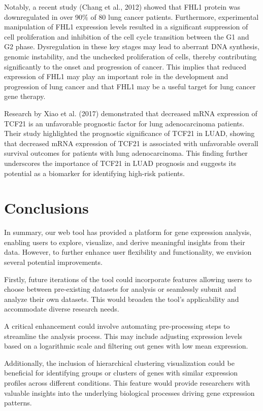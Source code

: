 \documentclass[
	a4paper, %
	10pt, %
	unnumberedsections, %
	twoside, %
]{LTJournalArticle}
\begin{document}
Notably, a recent study (Chang et al., 2012) \autocite{Chang:fhl1} showed that FHL1 protein was downregulated in over 90$\%$ of 80 lung cancer patients. Furthermore, experimental manipulation of FHL1 expression levels resulted in a significant suppression of cell proliferation and inhibition of the cell cycle transition between the G1 and G2 phase. Dysregulation in these key stages may lead to aberrant DNA synthesis, genomic instability, and the unchecked proliferation of cells, thereby contributing significantly to the onset and progression of cancer. This implies that reduced expression of FHL1 may play an important role in the development and progression of lung cancer and that FHL1 may be a useful target for lung cancer gene therapy.

Research by Xiao et al. (2017) \autocite{Xiao:TCF21} demonstrated that decreased mRNA expression of TCF21 is an unfavorable prognostic factor for lung adenocarcinoma patients. Their study highlighted the prognostic significance of TCF21 in LUAD, showing that decreased mRNA expression of TCF21 is associated with unfavorable overall survival outcomes for patients with lung adenocarcinoma. This finding further underscores the importance of TCF21 in LUAD prognosis and suggests its potential as a biomarker for identifying high-risk patients.

\section{Conclusions}

In summary, our web tool has provided a platform for gene expression analysis, enabling users to explore, visualize, and derive meaningful insights from their data. However, to further enhance user flexibility and functionality, we envision several potential improvements.

Firstly, future iterations of the tool could incorporate features allowing users to choose between pre-existing datasets for analysis or seamlessly submit and analyze their own datasets. This would broaden the tool's applicability and accommodate diverse research needs.

A critical enhancement could involve automating pre-processing steps to streamline the analysis process. This may include adjusting expression levels based on a logarithmic scale and filtering out genes with low mean expression.

Additionally, the inclusion of hierarchical clustering visualization could be beneficial for identifying groups or clusters of genes with similar expression profiles across different conditions. This feature would provide researchers with valuable insights into the underlying biological processes driving gene expression patterns.
\end{document}
